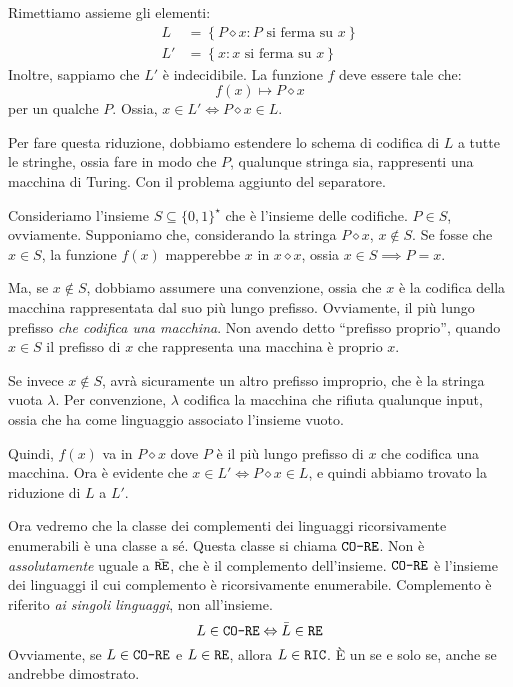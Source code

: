 Rimettiamo assieme gli elementi:
\begin{align*}
L &= \left\{ P \diamond x : P \text{ si ferma su } x \right\} \\
L' &= \left\{ x : x \text{ si ferma su } x \right\}
\end{align*}
Inoltre, sappiamo che $L'$ \`e indecidibile. La funzione $f$ deve essere tale che:
\[
f(x) \mapsto P \diamond x
\]
per un qualche $P$. Ossia, $x \in L' \iff P \diamond x \in L$.

Per fare questa riduzione, dobbiamo estendere lo schema di codifica di $L$ a tutte le stringhe, ossia fare in modo che $P$, qualunque stringa sia, rappresenti una macchina di Turing. Con il problema aggiunto del separatore. 

Consideriamo l'insieme $S \subseteq \{0,1\}^{\star}$ che \`e l'insieme delle codifiche. $P \in S$, ovviamente. Supponiamo che, considerando la stringa $P \diamond x$, $x \notin S$. Se fosse che $x \in S$, la funzione $f(x)$ mapperebbe $x$ in $x \diamond x$, ossia $x \in S \implies P = x$.

Ma, se $x \notin S$, dobbiamo assumere una convenzione, ossia che $x$ \`e la codifica della macchina rappresentata dal suo pi\`u lungo prefisso. Ovviamente, il pi\`u lungo prefisso \emph{che codifica una macchina}. Non avendo detto ``prefisso proprio'', quando $x \in S$ il prefisso di $x$ che rappresenta una macchina \`e proprio $x$.

Se invece $x \notin S$, avr\`a sicuramente un altro prefisso improprio, che \`e la stringa vuota $\lambda$. Per convenzione, $\lambda$ codifica la macchina che rifiuta qualunque input, ossia che ha come linguaggio associato l'insieme vuoto.

Quindi, $f(x)$ va in $P \diamond x$ dove $P$ \`e il pi\`u lungo prefisso di $x$ che codifica una macchina. Ora \`e evidente che $x \in L' \iff P \diamond x \in L$, e quindi abbiamo trovato la riduzione di $L$ a $L'$.

Ora vedremo che la classe dei complementi dei linguaggi ricorsivamente enumerabili \`e una classe a s\'e. Questa classe si chiama $\texttt{CO-RE}$. Non \`e \emph{assolutamente} uguale a $\bar{\texttt{RE}}$, che \`e il complemento dell'insieme. $\texttt{CO-RE}$ \`e l'insieme dei linguaggi il cui complemento \`e ricorsivamente enumerabile. Complemento \`e riferito \emph{ai singoli linguaggi}, non all'insieme.
\[
L \in \texttt{CO-RE} \Leftrightarrow \bar{L} \in \texttt{RE}
\]
Ovviamente, se $L \in \texttt{CO-RE}$ e $L \in \texttt{RE}$, allora $L \in \texttt{RIC}$. \`E un se e solo se, anche se andrebbe dimostrato.

